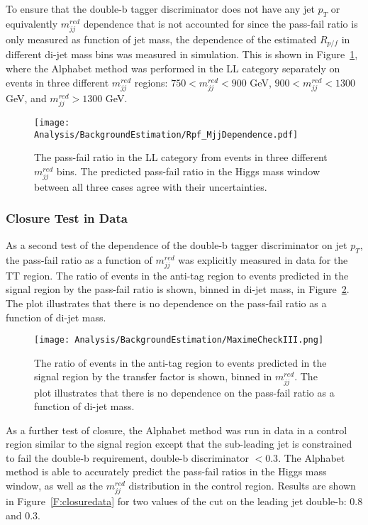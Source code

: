 To ensure that the double-b tagger discriminator does not have any jet $p_{T}$ or equivalently $m_{jj}^{red}$ dependence that is not accounted for since the pass-fail ratio is only measured as function of jet mass, the dependence of the estimated $R_{p/f}$ in different di-jet mass bins was measured in simulation. This is shown in Figure~\ref{fig:INJ2}, where the Alphabet method was performed in the LL category separately on events in three different $m_{jj}^{red}$ regions: $750 < m_{jj}^{red} < 900$ GeV, $900 < m_{jj}^{red} < 1300$ GeV, and $ m_{jj}^{red} > 1300$ GeV. 

\begin{figure}[h!]
  \centering
    \texttt{[image: Analysis/BackgroundEstimation/Rpf\_MjjDependence.pdf]}
  \caption{The pass-fail ratio in the LL category from events in three different $m_{jj}^{red}$ bins. The predicted pass-fail ratio in the Higgs mass window between all three cases agree with their uncertainties.} \label{fig:INJ2}
\end{figure}

\subsubsection{Closure Test in Data}

As a second test of the dependence of the double-b tagger discriminator on jet $p_{T}$, the pass-fail ratio as a function of $m_{jj}^{red}$ was explicitly measured in data for the TT region. The ratio of events in the anti-tag region to events predicted in the signal region by the pass-fail ratio is shown, binned in di-jet mass, in Figure~\ref{fig:MaximeCheckII}. The plot illustrates that there is no dependence on the pass-fail ratio as a function of di-jet mass. 

\begin{figure}[h!]
  \centering
    \texttt{[image: Analysis/BackgroundEstimation/MaximeCheckIII.png]}
\caption{The ratio of events in the anti-tag region to events predicted in the signal region by the transfer factor is shown, binned in $m_{jj}^{red}$. The plot illustrates that there is no dependence on the pass-fail ratio as a function of di-jet mass. } \label{fig:MaximeCheckII}
\end{figure}

As a further test of closure, the Alphabet method was run in data in a control region similar to the signal region except that the sub-leading jet is constrained to fail the double-b requirement, double-b discriminator $<0.3$. The Alphabet method is able to accurately predict the pass-fail ratios in the Higgs mass window, as well as the $m_{jj}^{red}$ distribution in the control region. Results are shown in Figure~\ref{F:closuredata} for two values of the cut on the leading jet double-b: 0.8 and 0.3.

